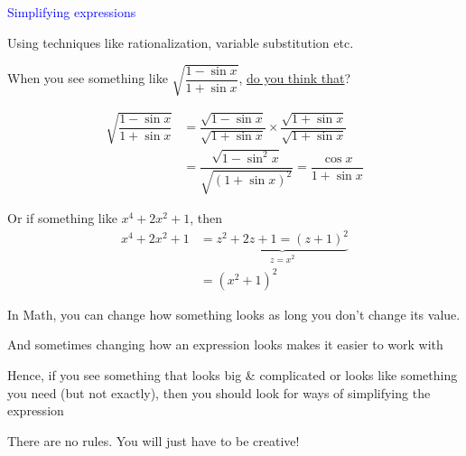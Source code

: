 \documentclass[14pt,fleqn]{extarticle}
\begin{document}
\begin{skill}
\textcolor{blue}{Simplifying expressions}

Using techniques like rationalization, variable substitution etc. 
\end{skill}

\newcard 

When you see something like $\sqrt{\dfrac{1-\sin x}{1+\sin x}}$, \underline{do you think that}? 

\begin{align}
	\sqrt{\dfrac{1-\sin x}{1+\sin x}} &= \dfrac{\sqrt{1-\sin x}}{\sqrt{1+\sin x}}\times\dfrac{\sqrt{1+\sin x}}{\sqrt{1+\sin x}} \\
	&= \dfrac{\sqrt{1-\sin^2 x}}{\sqrt{\left(1+\sin x \right)^2}} = \dfrac{\cos x}{1+\sin x} 
\end{align}

Or if something like $x^4+2x^2+1$, then 
\begin{align}
	x^4 +2x^2 + 1 &= \underbrace{z^2 + 2z + 1 = (z+1)^2}_{z = x^2}  \\
	&= \left(x^2+1 \right) ^2 
\end{align}

In Math, you can change how something looks as long you don't change its value.\newline

And sometimes changing how an expression looks makes it easier to work with \newline 

Hence, if you see something that looks big \& complicated or looks like something you need (but not exactly), then you should look for ways of simplifying the expression\newline 

There are no rules. You will just have to be creative! 
\end{document}
